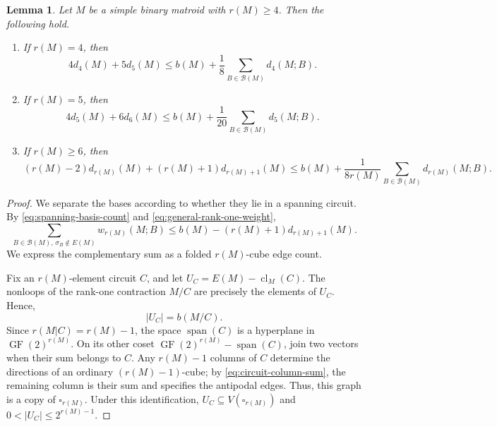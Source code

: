 \documentclass[10pt,a4paper]{article}
\numberwithin{equation}{section}
\newtheorem{lemma}[lemma]{Lemma}
\DeclareMathOperator{\GF}{GF}
\DeclareMathOperator{\cl}{cl}
\DeclareMathOperator{\spanof}{span}
\newcommand{\BB}{\mathcal B}
\newcommand{\FF}{\GF(2)}
\newcommand{\wloc}[1]{w_{#1}(M;B)}
\newcommand{\dloc}[1]{d_{#1}(M;B)}
\begin{document}
\begin{lemma}\label{lem:cube-count}
Let \(M\) be a simple binary matroid with \(r(M)\ge4\).
Then the following hold.
\begin{enumerate}
\item[\(\mathrm{(i)}\)] If \(r(M)=4\), then
\[
 4d_4(M)+5d_5(M)
 \le b(M)+\frac18\sum_{B\in\BB(M)}\dloc4.
\]
\item[\(\mathrm{(ii)}\)] If \(r(M)=5\), then
\[
 4d_5(M)+6d_6(M)
 \le b(M)+\frac1{20}\sum_{B\in\BB(M)}\dloc5.
\]
\item[\(\mathrm{(iii)}\)] If \(r(M)\ge6\), then
\[
 (r(M)-2)d_{r(M)}(M)+(r(M)+1)d_{r(M)+1}(M)
 \le b(M)+\frac1{8r(M)}\sum_{B\in\BB(M)}\dloc{r(M)}.
\]
\end{enumerate}
\end{lemma}
\begin{proof}
We separate the bases according to whether they lie in a spanning circuit.
By \eqref{eq:spanning-basis-count} and \eqref{eq:general-rank-one-weight},
\begin{equation}\label{eq:basis}
 \sum_{B\in\BB(M),\,\sigma_B\notin E(M)}\wloc{r(M)}
 \le b(M)-(r(M)+1)d_{r(M)+1}(M).
\end{equation}
We express the complementary sum as a folded \(r(M)\)-cube edge count.

Fix an \(r(M)\)-element circuit \(C\), and let
\(U_C=E(M)-\cl_M(C)\).
The nonloops of the rank-one contraction \(M/C\) are precisely
the elements of \(U_C\). Hence,
\begin{equation}\label{eq:outside-hyperplane}
 |U_C|=b(M/C).
\end{equation}
Since \(r(M|C)=r(M)-1\), the space \(\spanof(C)\) is a hyperplane in \(\FF^{r(M)}\).
On its other coset \(\FF^{r(M)}-\spanof(C)\), join two vectors
when their sum belongs to \(C\). Any \(r(M)-1\) columns of \(C\) determine the
directions of an ordinary \((r(M)-1)\)-cube; by \eqref{eq:circuit-column-sum},
the remaining column is their sum and specifies the antipodal edges.
Thus, this graph is a copy of \(\square_{r(M)}\). Under this identification,
\(U_C\subseteq V(\square_{r(M)})\) and
\(0<|U_C|\le2^{r(M)-1}\).


\end{proof}
\end{document}
